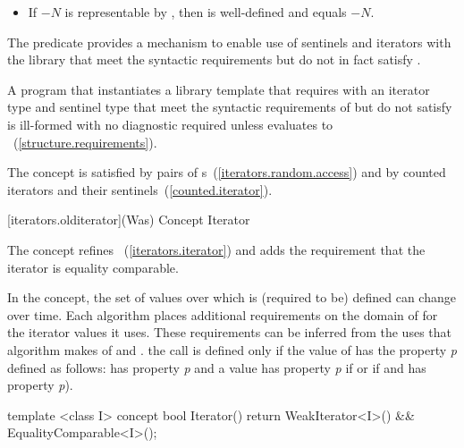 \begin{addedblock}
{\begin{itemdescr}
\begin{itemize}
\item If $-N$ is representable by ,
      then  is well-defined and equals $-N$.
\end{itemize}
\end{itemdescr}

\pnum
The  predicate provides a mechanism to
enable use of sentinels and iterators with the library that meet the
syntactic requirements but do not in fact satisfy .

\pnum
\enternote A program that instantiates a library template that requires
 with an iterator type  and sentinel type
 that meet the syntactic requirements of 
but do not satisfy  is ill-formed with no diagnostic required
unless  evaluates to
~(\ref{structure.requirements}). \exitnote
} %

\pnum
\enternote The 
concept is satisfied by pairs of
s~(\ref{iterators.random.access}) and by
counted iterators and their sentinels~(\ref{counted.iterator}).\exitnote

{\color{oldclr}
[iterators.olditerator]{(Was) Concept Iterator}

\pnum
The  concept refines ~(\ref{iterators.iterator}) and adds
the requirement that the iterator is equality comparable.

\pnum
In the  concept, the set of values over which
\tcode{==} is (required to be) defined can change over time.
Each algorithm places additional requirements on the domain of
\tcode{==} for the iterator values it uses.
These requirements can be inferred from the uses that algorithm
makes of \tcode{==} and \tcode{!=}.
\enterexample
the call 
is defined only if the value of 
has the property \textit{p}
defined as follows:
 has property \textit{p}
and a value 
has property \textit{p}
if
or if
and
has property
\textit{p}).
\exitexample

\begin{itemdecl}
  template <class I>
  concept bool Iterator() {
    return WeakIterator<I>() &&
      EqualityComparable<I>();
  }
\end{itemdecl}
} %
\end{addedblock}

